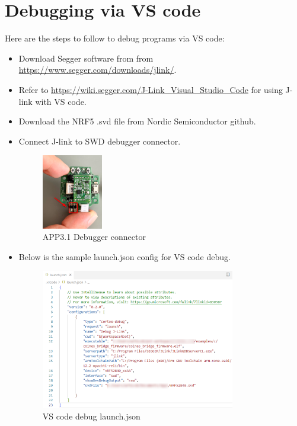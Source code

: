 \documentclass[11pt,headings=small]{scrartcl}
\begin{document}
\newpage
\section{Debugging via VS code}
Here are the steps to follow to debug programs via VS code:
\begin{itemize}
	\item Download Segger software from from \url{https://www.segger.com/downloads/jlink/}.
	\item Refer to \url{https://wiki.segger.com/J-Link_Visual_Studio_Code} for using J-link with VS code.
	\item Download the NRF5 .svd file from Nordic Semiconductor github.
	\item Connect J-link to SWD debugger connector.
	\begin{figure}[H]
		\begin{center}
			\includegraphics[width=0.25\textwidth]{coinesAPI_images/App31_jlink_connection.png}
			\caption{APP3.1 Debugger connector}
		\end{center}
	\end{figure}
	\item Below is the sample launch.json config for VS code debug.
	\begin{figure}[H]
		\begin{center}
			\includegraphics[width=0.8\textwidth]{coinesAPI_images/Debug_launch_json.png}
			\caption{VS code debug launch.json}
		\end{center}
	\end{figure}
\end{itemize}
\end{document}
